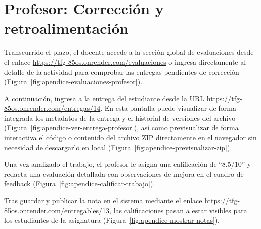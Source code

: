 
\section{Profesor: Correcci\'on y retroalimentaci\'on}

Transcurrido el plazo, el docente accede a la secci\'on global de evaluaciones desde el enlace \url{https://tfg-85os.onrender.com/evaluaciones} o ingresa directamente al detalle de la actividad para comprobar las entregas pendientes de correcci\'on (Figura~\ref{fig:apendice-evaluaciones-profesor}).


A continuaci\'on, ingresa a la entrega del estudiante desde la URL \url{https://tfg-85os.onrender.com/entregas/14}. En esta pantalla puede visualizar de forma integrada los metadatos de la entrega y el historial de versiones del archivo (Figura~\ref{fig:apendice-ver-entrega-profesor}), as\'i como previsualizar de forma interactiva el c\'odigo o contenido del archivo ZIP directamente en el navegador sin necesidad de descargarlo en local (Figura~\ref{fig:apendice-previsualizar-zip}).



Una vez analizado el trabajo, el profesor le asigna una calificaci\'on de ``8.5/10'' y redacta una evaluaci\'on detallada con observaciones de mejora en el cuadro de feedback (Figura~\ref{fig:apendice-calificar-trabajo}).


Tras guardar y publicar la nota en el sistema mediante el enlace \url{https://tfg-85os.onrender.com/entregables/13}, las calificaciones pasan a estar visibles para los estudiantes de la asignatura (Figura~\ref{fig:apendice-mostrar-notas}).

